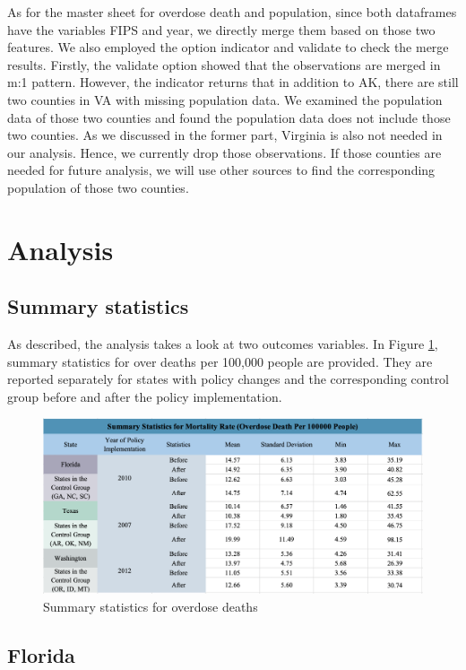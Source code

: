 \documentclass[12pt,letterpaper]{article}
\begin{document}
As for the master sheet for overdose death and population, since both dataframes have the variables FIPS and year, we directly merge them based on those two features. We also employed the option indicator and validate to check the merge results. Firstly, the validate option showed that the observations are merged in m:1 pattern. However, the indicator returns that in addition to AK, there are still two counties in VA with missing population data. We examined the population data of those two counties and found the population data does not include those two counties. As we discussed in the former part, Virginia is also not needed in our analysis. Hence, we currently drop those observations. If those counties are needed for future analysis, we will use other sources to find the corresponding population of those two counties.

\section{Analysis}

\subsection{Summary statistics}
As described, the analysis takes a look at two outcomes variables. In Figure \ref{fig:sum_deaths}, summary statistics for over deaths per 100,000 people are provided. They are reported separately for states with policy changes and the corresponding control group before and after the policy implementation.

\begin{figure}[!h]
  \centering
\includegraphics[width=0.7\linewidth]{../30_results/General_Results/death_statistic_analysis.png}
  \caption{Summary statistics for overdose deaths}
  \label{fig:sum_deaths}
\end{figure}  


\subsection{Florida}
\end{document}
